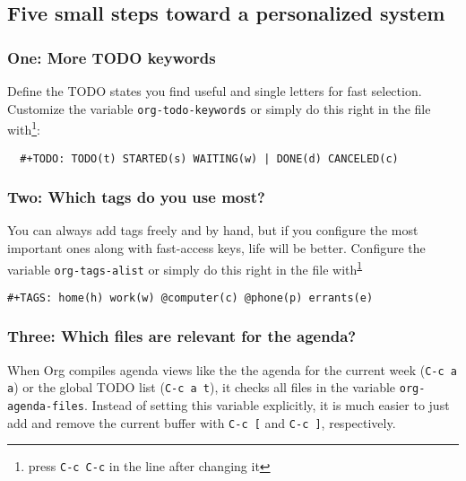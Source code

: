 \documentclass[11pt]{article}
\begin{document}
\subsection*{Five small steps toward a personalized system}
\label{sec:org9ba8a65}

\subsubsection*{One: More TODO keywords}
\label{sec:org48cf150}


Define the TODO states you find useful and single letters for fast
selection.  Customize the variable \texttt{org-todo-keywords} or simply do this
right in the file with\footnote{press \texttt{C-c C-c} in the line after changing it\label{org4124dac}}:

\begin{verbatim}
  #+TODO: TODO(t) STARTED(s) WAITING(w) | DONE(d) CANCELED(c)
\end{verbatim}

\subsubsection*{Two: Which tags do you use most?}
\label{sec:orge4dbe0d}


You can always add tags freely and by hand, but if you configure the
most important ones along with fast-access keys, life will be better.
Configure the variable \texttt{org-tags-alist} or simply do this right in the
file with\textsuperscript{\ref{org4124dac}}

\begin{verbatim}
#+TAGS: home(h) work(w) @computer(c) @phone(p) errants(e)
\end{verbatim}

\subsubsection*{Three: Which files are relevant for the agenda?}
\label{sec:orgc12b8e2}


When Org compiles agenda views like the the agenda for the current
week (\texttt{C-c a a}) or the global TODO list (\texttt{C-c a t}), it checks all
files in the variable \texttt{org-agenda-files}.  Instead of setting this
variable explicitly, it is much easier to just add and remove the
current buffer with \texttt{C-c [} and \texttt{C-c ]}, respectively.
\end{document}
